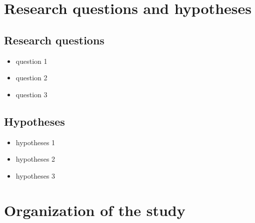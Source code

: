 \section{Research questions and hypotheses}
\subsection{Research questions}
\justifying
\begin{itemize}
    \item question 1
    \item question 2
    \item question 3
\end{itemize}
\subsection{Hypotheses}
\justifying
\begin{itemize}
    \item hypotheses 1
    \item hypotheses 2
    \item hypotheses 3
\end{itemize}


\section{Organization of the study}
\justifying
\lipsum[1]


